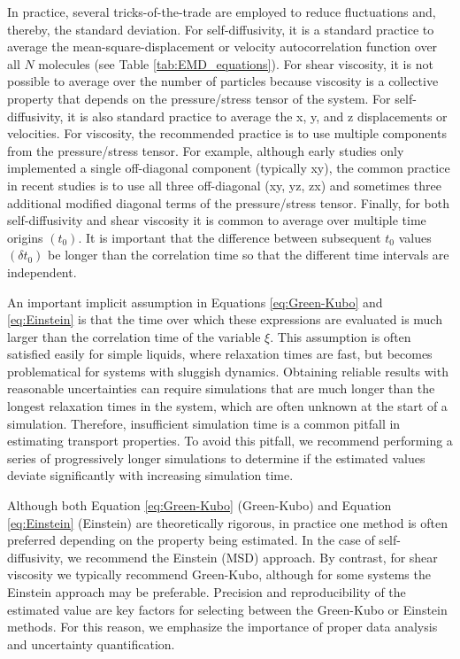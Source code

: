 \documentclass[9pt]{livecoms}
\begin{document}
In practice, several tricks-of-the-trade are employed to reduce fluctuations and, thereby, the standard deviation. For self-diffusivity, it is a standard practice to average the mean-square-displacement or velocity autocorrelation function over all $N$ molecules (see Table \ref{tab:EMD_equations}). For shear viscosity, it is not possible to average over the number of particles because viscosity is a collective property that depends on the pressure/stress tensor of the system. For self-diffusivity, it is also standard practice to average the x, y, and z displacements or velocities. For viscosity, the recommended practice is to use multiple components from the pressure/stress tensor. For example, although early studies only implemented a single off-diagonal component (typically xy), the common practice in recent studies is to use all three off-diagonal (xy, yz, zx) and sometimes three additional modified diagonal terms of the pressure/stress tensor. Finally, for both self-diffusivity and shear viscosity it is common to average over multiple time origins $(t_0)$. It is important that the difference between subsequent $t_0$ values $(\delta t_0)$ be longer than the correlation time so that the different time intervals are independent.

An important implicit assumption in Equations \ref{eq:Green-Kubo} and \ref{eq:Einstein} is that the time over which these expressions are evaluated is much larger than the correlation time of the variable $\xi$. This assumption is often satisfied easily for simple liquids, where relaxation times are fast, but becomes problematical for systems with sluggish dynamics. Obtaining reliable results with reasonable uncertainties can require simulations that are much longer than the longest relaxation times in the system, which are often unknown at the start of a simulation. Therefore, insufficient simulation time is a common pitfall in estimating transport properties. To avoid this pitfall, we recommend performing a series of progressively longer simulations to determine if the estimated values deviate significantly with increasing simulation time.


Although both Equation \ref{eq:Green-Kubo} (Green-Kubo) and Equation \ref{eq:Einstein} (Einstein) are theoretically rigorous, in practice one method is often preferred depending on the property being estimated. In the case of self-diffusivity, we recommend the Einstein (MSD) approach. By contrast, for shear viscosity we typically recommend Green-Kubo, although for some systems the Einstein approach may be preferable. Precision and reproducibility of the estimated value are key factors for selecting between the Green-Kubo or Einstein methods. For this reason, we emphasize the importance of proper data analysis and uncertainty quantification.
\end{document}
